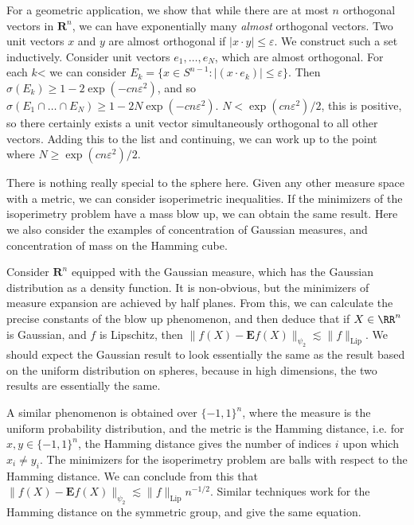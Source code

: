 \begin{example}
    For a geometric application, we show that while there are at most $n$ orthogonal vectors in $\mathbf{R}^n$, we can have exponentially many {\it almost} orthogonal vectors. Two unit vectors $x$ and $y$ are almost orthogonal if $|x \cdot y| \leq \varepsilon$. We construct such a set inductively. Consider unit vectors $e_1, \dots, e_N$, which are almost orthogonal. For each $k$< we can consider $E_k = \{ x \in S^{n-1} : |(x \cdot e_k)| \leq \varepsilon \}$. Then $\sigma(E_k) \geq 1 - 2\exp(-cn\varepsilon^2)$, and so $\sigma(E_1 \cap \dots \cap E_N) \geq 1 - 2N \exp(-cn \varepsilon^2)$. $N < \exp(cn\varepsilon^2)/2$, this is positive, so there certainly exists a unit vector simultaneously orthogonal to all other vectors. Adding this to the list and continuing, we can work up to the point where $N \geq \exp(cn \varepsilon^2)/2$.
\end{example}

There is nothing really special to the sphere here. Given any other measure space with a metric, we can consider isoperimetric inequalities. If the minimizers of the isoperimetry problem have a mass blow up, we can obtain the same result. Here we also consider the examples of concentration of Gaussian measures, and concentration of mass on the Hamming cube.

\begin{example}
    Consider $\mathbf{R}^n$ equipped with the Gaussian measure, which has the Gaussian distribution as a density function. It is non-obvious, but the minimizers of measure expansion are achieved by half planes. From this, we can calculate the precise constants of the blow up phenomenon, and then deduce that if $X \in \RR^n$ is Gaussian, and $f$ is Lipschitz, then $\| f(X) - \mathbf{E} f(X) \|_{\psi_2} \lesssim \| f \|_{\text{Lip}}$. We should expect the Gaussian result to look essentially the same as the result based on the uniform distribution on spheres, because in high dimensions, the two results are essentially the same.
\end{example}

\begin{example}
    A similar phenomenon is obtained over $\{ -1, 1 \}^n$, where the measure is the uniform probability distribution, and the metric is the Hamming distance, i.e. for $x,y \in \{ -1, 1 \}^n$, the Hamming distance gives the number of indices $i$ upon which $x_i \neq y_i$. The minimizers for the isoperimetry problem are balls with respect to the Hamming distance. We can conclude from this that $\| f(X) - \mathbf{E} f(X) \|_{\psi_2} \lesssim \| f \|_{\text{Lip}} n^{-1/2}$. Similar techniques work for the Hamming distance on the symmetric group, and give the same equation. 
\end{example}


